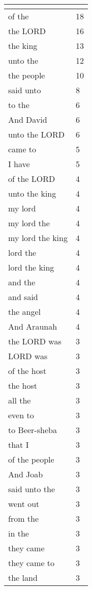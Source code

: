 \begin{center}
\begin{longtable}{|p{3.0in}|p{0.5in}|}
\hline \multicolumn{2}{c}{{ }} \\ \hline
\endfoot 
of the & 18\\ \hline 
the LORD & 16\\ \hline 
the king & 13\\ \hline 
unto the & 12\\ \hline 
the people & 10\\ \hline 
said unto & 8\\ \hline 
to the & 6\\ \hline 
And David & 6\\ \hline 
unto the LORD & 6\\ \hline 
came to & 5\\ \hline 
I have & 5\\ \hline 
of the LORD & 4\\ \hline 
unto the king & 4\\ \hline 
my lord & 4\\ \hline 
my lord the & 4\\ \hline 
my lord the king & 4\\ \hline 
lord the & 4\\ \hline 
lord the king & 4\\ \hline 
and the & 4\\ \hline 
and said & 4\\ \hline 
the angel & 4\\ \hline 
And Araunah & 4\\ \hline 
the LORD was & 3\\ \hline 
LORD was & 3\\ \hline 
of the host & 3\\ \hline 
the host & 3\\ \hline 
all the & 3\\ \hline 
even to & 3\\ \hline 
to Beer-sheba & 3\\ \hline 
that I & 3\\ \hline 
of the people & 3\\ \hline 
And Joab & 3\\ \hline 
said unto the & 3\\ \hline 
went out & 3\\ \hline 
from the & 3\\ \hline 
in the & 3\\ \hline 
they came & 3\\ \hline 
they came to & 3\\ \hline 
the land & 3\\ \hline 

\end{longtable}
\end{center}
